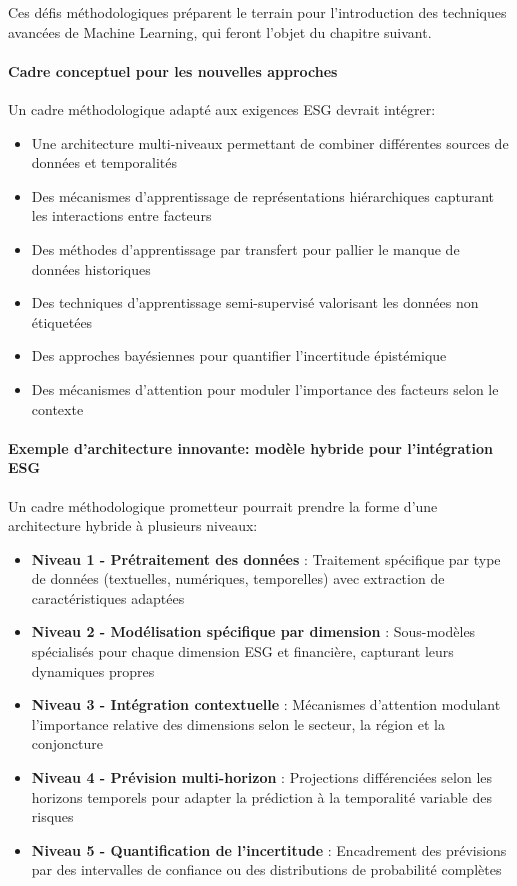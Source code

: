 Ces défis méthodologiques préparent le terrain pour l'introduction des techniques avancées de Machine Learning, qui feront l'objet du chapitre suivant.

\paragraph{Cadre conceptuel pour les nouvelles approches}
Un cadre méthodologique adapté aux exigences ESG devrait intégrer:

\begin{itemize}
    \item Une architecture multi-niveaux permettant de combiner différentes sources de données et temporalités
    \item Des mécanismes d'apprentissage de représentations hiérarchiques capturant les interactions entre facteurs
    \item Des méthodes d'apprentissage par transfert pour pallier le manque de données historiques
    \item Des techniques d'apprentissage semi-supervisé valorisant les données non étiquetées
    \item Des approches bayésiennes pour quantifier l'incertitude épistémique
    \item Des mécanismes d'attention pour moduler l'importance des facteurs selon le contexte
\end{itemize}

\paragraph{Exemple d'architecture innovante: modèle hybride pour l'intégration ESG}
Un cadre méthodologique prometteur pourrait prendre la forme d'une architecture hybride à plusieurs niveaux:

\begin{itemize}
    \item \textbf{Niveau 1 - Prétraitement des données} : Traitement spécifique par type de données (textuelles, numériques, temporelles) avec extraction de caractéristiques adaptées

    \item \textbf{Niveau 2 - Modélisation spécifique par dimension} : Sous-modèles spécialisés pour chaque dimension ESG et financière, capturant leurs dynamiques propres

    \item \textbf{Niveau 3 - Intégration contextuelle} : Mécanismes d'attention modulant l'importance relative des dimensions selon le secteur, la région et la conjoncture

    \item \textbf{Niveau 4 - Prévision multi-horizon} : Projections différenciées selon les horizons temporels pour adapter la prédiction à la temporalité variable des risques

    \item \textbf{Niveau 5 - Quantification de l'incertitude} : Encadrement des prévisions par des intervalles de confiance ou des distributions de probabilité complètes
\end{itemize}

